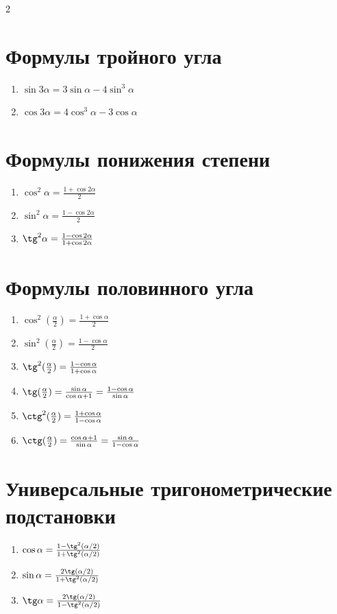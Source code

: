 \documentclass[]{article}
\begin{document}
\begin{multicols}{2}
		\section*{Формулы тройного угла}
		\begin{enumerate}
			\item $\sin 3\alpha = 3\sin\alpha - 4\sin^3\alpha$
			\item $\cos 3\alpha = 4\cos^3\alpha - 3\cos\alpha$
		\end{enumerate}
		
		\section*{Формулы понижения степени}
		\begin{enumerate}
			\item $\cos^2\alpha = \frac{1 + \cos 2\alpha}{2}$
			\item $\sin^2\alpha = \frac{1 - \cos 2\alpha}{2}$
			\item $\tg^2\alpha = \frac{1 - \cos 2\alpha}{1 + \cos 2\alpha}$
		\end{enumerate}
		
		\section*{Формулы половинного угла}
		\begin{enumerate}
			\item $\cos^2(\frac{\alpha}{2}) = \frac{1 + \cos\alpha}{2}$
			\item $\sin^2(\frac{\alpha}{2}) = \frac{1 - \cos\alpha}{2}$
			\item $\tg^2(\frac{\alpha}{2}) = \frac{1 - \cos\alpha}{1 + \cos\alpha}$
			\item $\tg(\frac{\alpha}{2}) = \frac{\sin\alpha}{\cos\alpha + 1} = \frac{1 - \cos\alpha}{\sin\alpha}$
			\item $\ctg^2(\frac{\alpha}{2}) = \frac{1 + \cos\alpha}{1 - \cos\alpha}$
			\item $\ctg(\frac{\alpha}{2}) = \frac{\cos\alpha + 1}{\sin\alpha} = \frac{\sin\alpha}{1 - \cos\alpha}$
		\end{enumerate}
		
		\section*{Универсальные тригонометрические подстановки}
		\begin{enumerate}
			\item $\cos\alpha = \frac{1 - \tg^2(\alpha/2)}{1 + \tg^2(\alpha/2)}$
			\item $\sin\alpha = \frac{2\tg(\alpha/2)}{1 + \tg^2(\alpha/2)}$
			\item $\tg\alpha = \frac{2\tg(\alpha/2)}{1 - \tg^2(\alpha/2)}$
		\end{enumerate}
		

\end{multicols}
\end{document}

